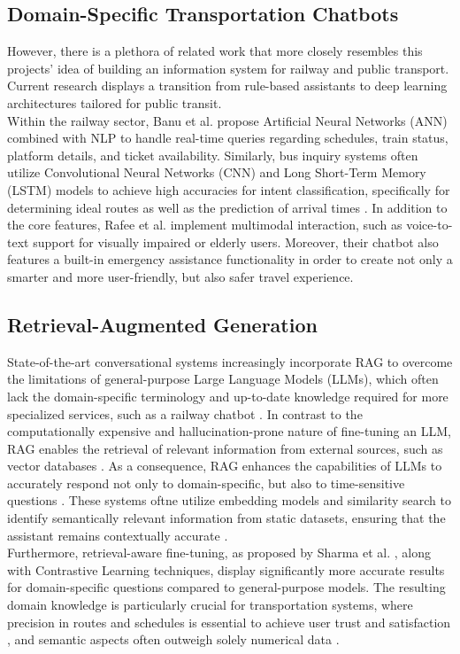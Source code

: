 \documentclass[fleqn,moreauthors,10pt]{ds_report}
\begin{document}
\subsection*{Domain-Specific Transportation Chatbots}
However, there is a plethora of related work that more closely resembles this projects' idea of building an information system for railway and public transport. Current research displays a transition from rule-based assistants to deep learning architectures tailored for public transit. \\
Within the railway sector, Banu et al. \cite{Banu.2025} propose Artificial Neural Networks (ANN) combined with NLP to handle real-time queries regarding schedules, train status, platform details, and ticket availability. Similarly, bus inquiry systems often utilize Convolutional Neural Networks (CNN) and Long Short-Term Memory (LSTM) models to achieve high accuracies for intent classification, specifically for determining ideal routes as well as the prediction of arrival times \cite{rafee2025bus, dharani_interactive_2020, d_smart_2025, Prathamesh.2022}. In addition to the core features, Rafee et al. \cite{rafee2025bus} implement multimodal interaction, such as voice-to-text support for visually impaired or elderly users. Moreover, their chatbot also features a built-in emergency assistance functionality in order to create not only a smarter and more user-friendly, but also safer travel experience. 

\subsection*{Retrieval-Augmented Generation}
State-of-the-art conversational systems increasingly incorporate RAG to overcome the limitations of general-purpose Large Language Models (LLMs), which often lack the domain-specific terminology and up-to-date knowledge required for more specialized services, such as a railway chatbot \cite{sharma_retrieval_2024}. In contrast to the computationally expensive and hallucination-prone nature of fine-tuning an LLM, RAG enables the retrieval of relevant information from external sources, such as vector databases \cite{xu_genai-powered_2024}. As a consequence, RAG enhances the capabilities of LLMs to accurately respond not only to domain-specific, but also to time-sensitive questions \cite{xu_genai-powered_2024}. These systems oftne utilize embedding models and similarity search to identify semantically relevant information from static datasets, ensuring that the assistant remains contextually accurate \cite{xu_genai-powered_2024, sufi_ai-driven_2025}. \\
Furthermore, retrieval-aware fine-tuning, as proposed by Sharma et al. \cite{sharma_retrieval_2024}, along with Contrastive Learning techniques, display significantly more accurate results for domain-specific questions compared to general-purpose models. The resulting domain knowledge is particularly crucial for transportation systems, where precision in routes and schedules is essential to achieve user trust and satisfaction \cite{kuberkar_factors_2020}, and semantic aspects often outweigh solely numerical data \cite{wang_traffic_2024}. 
\end{document}
